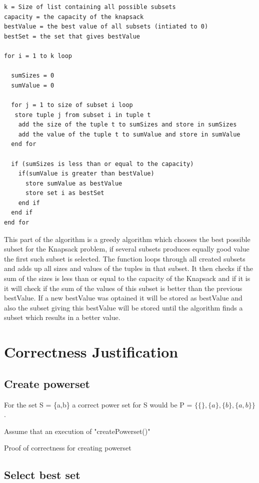 \documentclass{inc/mas}
\begin{document}
\begin{lstlisting}
k = Size of list containing all possible subsets
capacity = the capacity of the knapsack
bestValue = the best value of all subsets (intiated to 0)
bestSet = the set that gives bestValue

for i = 1 to k loop

  sumSizes = 0
  sumValue = 0

  for j = 1 to size of subset i loop
   store tuple j from subset i in tuple t
    add the size of the tuple t to sumSizes and store in sumSizes
    add the value of the tuple t to sumValue and store in sumValue
  end for

  if (sumSizes is less than or equal to the capacity)
    if(sumValue is greater than bestValue)
      store sumValue as bestValue
      store set i as bestSet
    end if
  end if
end for
\end{lstlisting}

\noindent This part of the algorithm is a greedy algorithm which chooses the best possible subset for the Knapsack problem, if several subsets produces equally good value the first such subset is selected. The function loops through all created subsets and adds up all sizes and values of the tuples in that subset. It then checks if the sum of the sizes is less than or equal to the capacity of the Knapsack and if it is it will check if the sum of the values of this subset is better than the previous bestValue. If a new bestValue was optained it will be stored as bestValue and also the subset giving this bestValue will be stored until the algorithm finds a subset which results in a better value.\\

\section{Correctness Justification}

\subsection{Create powerset}

For the set S = \{a,b\} a correct power set for S would be P = $\{\{\},\{a\},\{b\},\{a,b\}\}$.

Assume that an execution of "createPowerset()"


Proof of correctness for creating powerset

\subsection{Select best set}
\end{document}

